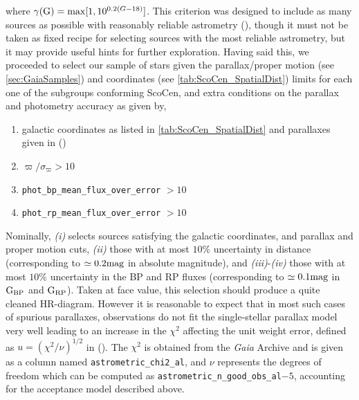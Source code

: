 where $\gamma(\textnormal{G}) = \textnormal{max}[1, 10^{0.2(G-18)}]$. This criterion was designed to include as many sources as possible with reasonably reliable astrometry  (\citeyear{2018arXiv180409366L}), though it must not be taken as fixed recipe for selecting sources with the most reliable astrometry, but it may provide useful hints for further exploration. Having said this, we proceeded to select our sample of stars given the parallax/proper motion (see \autoref{sec:GaiaSamples}) and coordinates (see \autoref{tab:ScoCen_SpatialDist}) limits for each one of the subgroups conforming ScoCen, and extra conditions on the parallax and photometry accuracy as given by, 

\begin{enumerate}[label=(\roman*)]
\item galactic coordinates as listed in \autoref{tab:ScoCen_SpatialDist} and parallaxes given in  (\citeyear{2016MNRAS.461..794P})
\item $\varpi/\sigma_\varpi > 10$
\item \texttt{phot\_bp\_mean\_flux\_over\_error} $> 10$
\item \texttt{phot\_rp\_mean\_flux\_over\_error} $> 10$
\end{enumerate}

Nominally, \textit{(i)} selects sources satisfying the galactic coordinates, and parallax and proper motion cuts, \textit{(ii)} those with at most $10\%$ uncertainty in distance (corresponding to $\simeq 0.2 \textnormal{mag}$ in absolute magnitude), and \textit{(iii)}-\textit{(iv)} those with at most $10\%$ uncertainty in the BP and RP fluxes (corresponding to $\simeq 0.1 \textnormal{mag}$ in $\textnormal{G}_\textnormal{BP}$ and $\textnormal{G}_\textnormal{RP}$). Taken at face value, this selection should produce a quite cleaned HR-diagram. However it is reasonable to expect that in most such cases of spurious parallaxes, observations do not fit the single-stellar parallax model very well leading to an increase in the $\chi^2$ affecting the unit weight error, defined as $u = (\chi^2/\nu)^{1/2}$ in  (\citeyear{2018arXiv180409366L}). The $\chi^2$ is obtained from the \textit{Gaia} Archive and is given as a column named \texttt{astrometric\_chi2\_al}, and $\nu$ represents the degrees of freedom which can be computed as \texttt{astrometric\_n\_good\_obs\_al}$-5$, accounting for the acceptance model described above.\\


